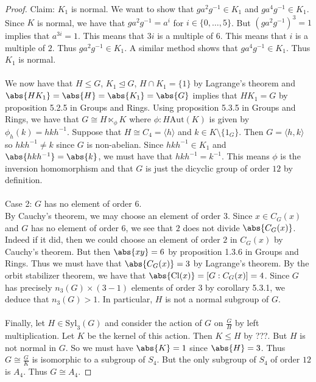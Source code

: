 \documentclass[a4paper]{article}
\begin{document}
\begin{thm}{}{}
\begin{proof}
Claim: $K_1$ is normal. We want to show that $ga^2g^{-1}\in K_1$ and $ga^4g^{-1}\in K_1$. Since $K$ is normal, we have that $ga^2g^{-1}=a^i$ for $i\in\{0,\dots,5\}$. But $(ga^2g^{-1})^3=1$ implies that $a^{3i}=1$. This means that $3i$ is a multiple of $6$. This means that $i$ is a multiple of $2$. Thus $ga^2g^{-1}\in K_1$. A similar method shows that $ga^4g^{-1}\in K_1$. Thus $K_1$ is normal. \\~\\

We now have that $H\leq G$, $K_1\trianglelefteq G$, $H\cap K_1=\{1\}$ by Lagrange's theorem and $\abs{HK_1}=\abs{H}=\abs{K_1}=\abs{G}$ implies that $HK_1=G$ by proposition 5.2.5 in Groups and Rings. Using proposition 5.3.5 in Groups and Rings, we have that $G\cong H\ltimes_\phi K$ where $\phi:H\text{Aut}(K)$ is given by $\phi_h(k)=hkh^{-1}$. Suppose that $H\cong C_4=\langle h\rangle$ and $k\in K\setminus\{1_G\}$. Then $G=\langle h,k\rangle$ so $hkh^{-1}\neq k$ since $G$ is non-abelian. Since $hkh^{-1}\in K_1$ and $\abs{hkh^{-1}}=\abs{k}$, we must have that $hkh^{-1}=k^{-1}$. This means $\phi$ is the inversion homomorphism and that $G$ is just the dicyclic group of order $12$ by definition. \\~\\

Case 2: $G$ has no element of order $6$. \\
By Cauchy's theorem, we may choose an element of order $3$. Since $x\in C_G(x)$ and $G$ has no element of order $6$, we see that $2$ does not divide $\abs{C_G(x)}$. Indeed if it did, then we could choose an element of order $2$ in $C_G(x)$ by Cauchy's theorem. But then $\abs{xy}=6$ by proposition 1.3.6 in Groups and Rings. Thus we must have that $\abs{C_G(x)}=3$ by Lagrange's theorem. By the orbit stabilizer theorem, we have that $\abs{\text{Cl}(x)}=[G:C_G(x)]=4$. Since $G$ has precisely $n_3(G)\times(3-1)$ elements of order $3$ by corollary 5.3.1, we deduce that $n_3(G)>1$. In particular, $H$ is not a normal subgroup of $G$. \\~\\

Finally, let $H\in\text{Syl}_3(G)$ and consider the action of $G$ on $\frac{G}{H}$ by left multiplication. Let $K$ be the kernel of this action. Then $K\leq H$ by ???. But $H$ is not normal in $G$. So we must have $\abs{K}=1$ since $\abs{H}=3$. Thus $G\cong\frac{G}{K}$ is isomorphic to a subgroup of $S_4$. But the only subgroup of $S_4$ of order $12$ is $A_4$. Thus $G\cong A_4$. 
\end{proof}
\end{thm}
\end{document}
